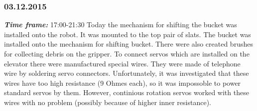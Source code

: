\subsubsection{03.12.2015}
\textit{\textbf{Time frame:}} 17:00-21:30 \newline
Today the mechanism for shifting the bucket was installed onto the robot. It was mounted to the top pair of slats.
The bucket was installed onto the mechanism for shifting bucket.
There were also created brushes for collecting debris on the gripper.
To connect servos which are installed on the elevator there were manufactured special wires. They were made of telephone wire by soldering servo connectors. Unfortunately, it was investigated that these wires have too high resistance (9 Ohmes each), so it was impossoble to power standard servos by them. However, continious rotation servos worked with these wires with no problem (possibly because of higher inner resistance).